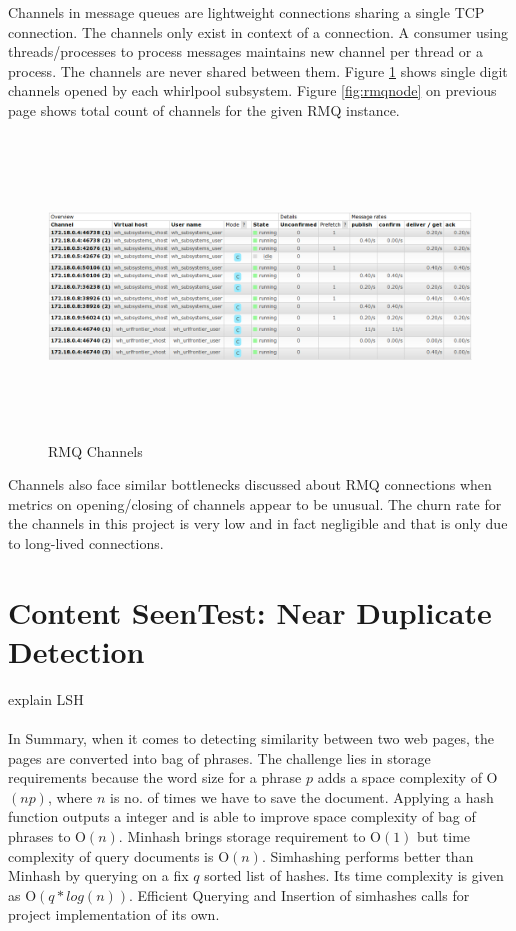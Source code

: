 \noindent
Channels in message queues are lightweight connections sharing a single TCP connection. The channels only exist in context of a connection. A consumer using threads/processes to process messages maintains new channel per thread or a process. The channels are never shared between them. Figure \ref{fig:rmqchannel} shows single digit
channels opened by each whirlpool subsystem. Figure \ref{fig:rmqnode} on previous
page shows total count of channels for the given RMQ instance.

\begin{figure}[h!]
  \centering
  \includegraphics[width=16cm,height=8cm,keepaspectratio]{../media/crawler/rmq_channels.png}
  \caption{RMQ Channels}
  \label{fig:rmqchannel}
\end{figure}

\noindent
Channels also face similar bottlenecks discussed about RMQ connections when metrics
on opening/closing of channels appear to be unusual. The churn rate for the channels
in this project is very low and in fact negligible and that is only due to long-lived connections.

\pagebreak

\section{Content SeenTest: Near Duplicate Detection}\label{handle_dedupe}
explain LSH
\\
\\
\noindent
In Summary, when it comes to detecting similarity between two web pages, the pages are converted into
bag of phrases. The challenge lies in storage requirements because the word size for a phrase $p$ adds
a space complexity of O$(np)$, where $n$ is no. of times we have to save the document. Applying a hash
function outputs a integer and is able to improve space complexity of bag of phrases to O$(n)$.
Minhash\cite{dedupe} brings storage requirement to O$(1)$ but time complexity of query documents is
O$(n)$. Simhashing\cite{dedupe} performs better than Minhash by querying on a fix $q$ sorted list of
hashes. Its time complexity is given as O$(q * log(n))$. Efficient Querying and Insertion of simhashes
calls for project implementation of its own.

